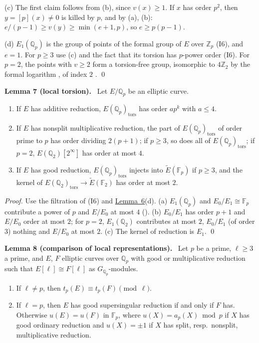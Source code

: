 \documentclass[11pt]{article}
\newenvironment{statement}[1]{\par\medskip\noindent\phantomsection\textbf{#1}\ }{\par\medskip}
\newcommand{\Q}{\mathbb Q}
\newcommand{\Z}{\mathbb Z}
\newcommand{\F}{\mathbb F}
\newcommand{\tors}{\mathrm{tors}}
\begin{document}
(c) The first claim follows from (b), since \(v(x)\ge1\). If \(x\) has order \(p^2\), then \(y=[p](x)\ne0\) is
killed by \(p\), and by (a), (b): \(e/(p-1)\ge v(y)\ge\min(e+1,p)\), so \(e\ge p(p-1)\).

(d) \(E_1(\Q_p)\) is the group of points of the formal group of \(E\) over \(\Z_p\) (I6), and \(e=1\). For \(p\ge3\)
use (c) and the fact that its torsion has \(p\)-power order (I6). For \(p=2\), the points with \(v\ge2\) form a
torsion-free group, isomorphic to \(4\Z_2\) by the formal logarithm \cite[Theorem~IV.6.4(b)]{Si1}, of index \(2\)
\cite[Proposition~IV.3.2(a)]{Si1}. \qed

\begin{statement}{Lemma 7 (local torsion).}\label{lemma-localtorsion}
Let \(E/\Q_p\) be an elliptic curve.
\begin{enumerate}
\item[(a)] If \(E\) has additive reduction, \(E(\Q_p)_\tors\) has order \(ap^k\) with \(a\le4\).
\item[(b)] If \(E\) has nonsplit multiplicative reduction, the part of \(E(\Q_p)_\tors\) of order prime to \(p\) has
order dividing \(2(p+1)\); if \(p\ge3\), so does all of \(E(\Q_p)_\tors\); if \(p=2\), \(E(\Q_2)[2^\infty]\) has
order at most \(4\).
\item[(c)] If \(E\) has good reduction, \(E(\Q_p)_\tors\) injects into \(\widetilde E(\F_p)\) if \(p\ge3\), and the
kernel of \(E(\Q_2)_\tors\to\widetilde E(\F_2)\) has order at most \(2\).
\end{enumerate}
\end{statement}

\emph{Proof.} Use the filtration of (I6) and \hyperref[lemma-formal]{Lemma~6}(d). (a) \(E_1(\Q_p)\) and
\(E_0/E_1\cong\F_p\) contribute a power of \(p\) and \(E/E_0\) at most \(4\) (\cite[Remark~IV.9.2.2]{Si2}). (b)
\(E_0/E_1\) has order \(p+1\) and \(E/E_0\) order at most \(2\); for \(p=2\), \(E_1(\Q_2)\) contributes at most
\(2\), \(E_0/E_1\) (of order \(3\)) nothing and \(E/E_0\) at most \(2\). (c) The kernel of reduction is \(E_1\). \qed

\begin{statement}{Lemma 8 (comparison of local representations).}\label{lemma-compare}
Let \(p\) be a prime, \(\ell\ge3\) a prime, and \(E\), \(F\) elliptic curves over \(\Q_p\) with good or
multiplicative reduction such that \(E[\ell]\cong F[\ell]\) as \(G_{\Q_p}\)-modules.
\begin{enumerate}
\item[(a)] If \(\ell\neq p\), then \(t_p(E)\equiv t_p(F)\pmod\ell\).
\item[(b)] If \(\ell=p\), then \(E\) has good supersingular reduction if and only if \(F\) has. Otherwise
\(u(E)=u(F)\) in \(\F_p\), where \(u(X)=a_p(X)\bmod p\) if \(X\) has good ordinary reduction and \(u(X)=\pm1\) if
\(X\) has split, resp.~nonsplit, multiplicative reduction.
\end{enumerate}
\end{statement}
\end{document}
